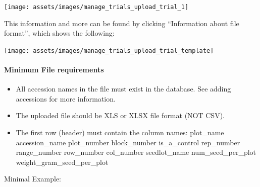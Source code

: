 \documentclass[
  12pt,
]{book}
\begin{document}
\begin{center}\texttt{[image: assets/images/manage\_trials\_upload\_trial\_1]} \end{center}

This information and more can be found by clicking ``Information about file format'', which shows the following:

\begin{center}\texttt{[image: assets/images/manage\_trials\_upload\_trial\_template]} \end{center}

\hypertarget{minimum-file-requirements}{%
\paragraph*{Minimum File requirements}\label{minimum-file-requirements}}

\begin{itemize}
\item
  All accession names in the file must exist in the database. See adding accessions for more information.
\item
  The uploaded file should be XLS or XLSX file format (NOT CSV).
\item
  The first row (header) must contain the column names: plot\_name accession\_name plot\_number block\_number is\_a\_control rep\_number range\_number row\_number col\_number seedlot\_name num\_seed\_per\_plot weight\_gram\_seed\_per\_plot
\end{itemize}

Minimal Example:
\end{document}
